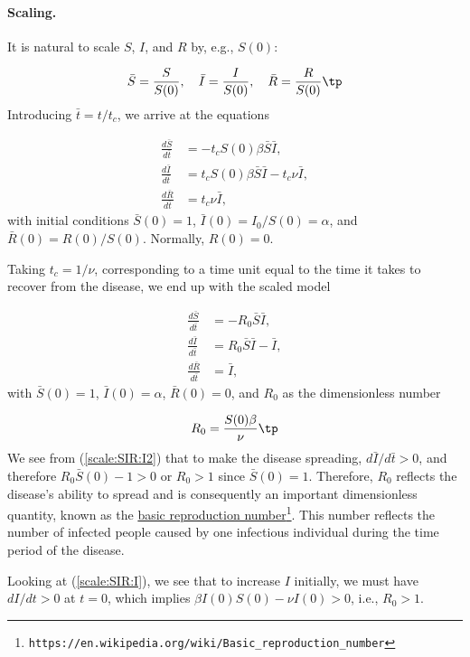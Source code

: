 \documentclass[graybox,envcountchap,sectrefs,final]{svmonodo}
\begin{document}
\paragraph{Scaling.}
It is natural to scale $S$, $I$, and $R$ by, e.g., $S(0)$:

\[ \bar S = \frac{S}{S(0)},\quad \bar I = \frac{I}{S(0)},\quad
\bar R = \frac{R}{S(0)}\tp
\]
Introducing $\bar t = t/t_c$, we arrive at the equations

\begin{align*}
\frac{d\bar S}{d\bar t} &= - t_c S(0) \beta\bar S\bar I,
\\ 
\frac{d\bar I}{d\bar t} &= t_c S(0) \beta \bar S\bar I - t_c \nu \bar I,
\\ 
\frac{d\bar R}{d\bar t} &= t_c \nu \bar I,
\end{align*}
with initial conditions $\bar S(0)=1$, $\bar I(0)=I_0/S(0)=\alpha$, and
$\bar R(0)=R(0)/S(0)$. Normally, $R(0)=0$.

Taking $t_c=1/\nu$, corresponding to a time unit equal to the time it takes
to recover from the disease, we end up with the scaled model

\begin{align}
\frac{d\bar S}{d\bar t} &= - R_0\bar S\bar I,
\label{scale:SIR:S2}\\ 
\frac{d\bar I}{d\bar t} &= R_0 \bar S\bar I - \bar I,
\label{scale:SIR:I2}\\ 
\frac{d\bar R}{d\bar t} &= \bar I,
\label{scale:SIR:R2}
\end{align}
with $\bar S(0)=1$, $\bar I(0)=\alpha$, $\bar R(0)=0$, and $R_0$ as
the dimensionless number

\begin{equation}
R_0 = \frac{S(0)\beta}{\nu}\tp
\end{equation}
We see from (\ref{scale:SIR:I2}) that to make the disease spreading,
$d\bar I/d\bar t >0$, and therefore $R_0 \bar S(0) - 1 > 0$ or $R_0 > 1$
since $\bar S(0)=1$.
Therefore, $R_0$ reflects the disease's ability to spread and is
consequently an important dimensionless quantity, known as the \href{{https://en.wikipedia.org/wiki/Basic_reproduction_number}}{basic
reproduction number}\footnote{\texttt{https://en.wikipedia.org/wiki/Basic\_reproduction\_number}}.
This number reflects the number of infected people caused by one infectious
individual during the time period of the disease.

Looking at (\ref{scale:SIR:I}), we see that to increase $I$ initially,
we must have $dI/dt >0$ at $t=0$, which implies
$\beta I(0)S(0) - \nu I(0) >0$, i.e., $R_0 > 1$.
\end{document}
